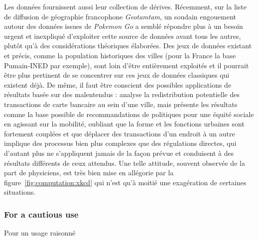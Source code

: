 {Les données fournissent aussi leur collection de dérives. Récemment, sur la liste de diffusion de géographie francophone \emph{Geotamtam}, un soudain engouement autour des données issues de \emph{Pokemon Go} a semblé répondre plus à un besoin urgent et inexpliqué d'exploiter cette source de données avant tous les autres, plutôt qu'à des considérations théoriques élaborées. Des jeux de données existant et précis, comme la population historiques des villes (pour la France la base Pumain-INED par exemple), sont loin d'être entièrement exploités et il pourrait être plus pertinent de se concentrer sur ces jeux de données classiques qui existent déjà. De même, il faut être conscient des possibles applications de résultats basée sur des malentendus : \cite{louail2016crowdsourcing} analyse la redistribution potentielle des transactions de carte bancaire au sein d'une ville, mais présente les résultats comme la base possible de recommandations de politiques pour une équité sociale en agissant sur la mobilité, oubliant que la forme et les fonctions urbaines sont fortement couplées et que déplacer des transactions d'un endroit à un autre implique des processus bien plus complexes que des régulations directes, qui d'autant plus ne s'appliquent jamais de la façon prévue et conduisent à des résultats différents de ceux attendus. Une telle attitude, souvent observée de la part de physiciens, est très bien mise en allégorie par la figure~\ref{fig:computation:xkcd} qui n'est qu'à moitié une exagération de certaines situations.
}


\subsubsection{For a cautious use}{Pour un usage raisonné}

